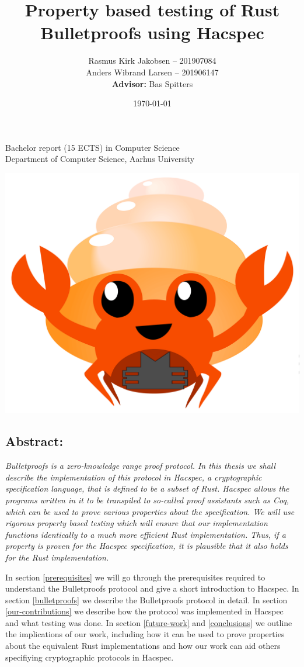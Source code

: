 \documentclass{article}
\title{Property based testing of Rust Bulletproofs using Hacspec}
\author{ 
Rasmus Kirk Jakobsen -- 201907084\\
Anders Wibrand Larsen -- 201906147\\
\textbf{Advisor:} Bas Spitters
}
\date{\today}
\begin{document}
\maketitle

\begin{center}
    Bachelor report (15 ECTS) in Computer Science\\
Department of Computer Science, Aarhus University\\
\end{center} 

\begin{center}
	\includegraphics[scale=0.4]{img/bulletproof-hacspec-2.png}
\end{center} 

\subsection*{Abstract:}

{\itshape
	Bulletproofs is a zero-knowledge range proof protocol. In this
	thesis we shall describe the implementation of this protocol
	in Hacspec, a cryptographic specification language, that is
	defined to be a subset of Rust. Hacspec allows the programs
	written in it to be transpiled to so-called proof assistants
	such as Coq, which can be used to prove various properties
	about the specification. We will use rigorous property based
	testing which will ensure that our implementation functions
	identically to a much more efficient Rust implementation. Thus,
	if a property is proven for the Hacspec specification, it is
	plausible that it also holds for the Rust implementation.

	In section \ref{prerequisites} we will go through the
	prerequisites required to understand the Bulletproofs
	protocol and give a short introduction to Hacspec. In section
	\ref{bulletproofs} we describe the Bulletproofs protocol in
	detail. In section \ref{our-contributions} we describe how
	the protocol was implemented in Hacspec and what testing was
	done. In section \ref{future-work} and \ref{conclusions}
	we outline the implications of our work, including how it
	can be used to prove properties about the equivalent Rust
	implementations and how our work can aid others specifiying
	cryptographic protocols in Hacspec.
}
\end{document}

